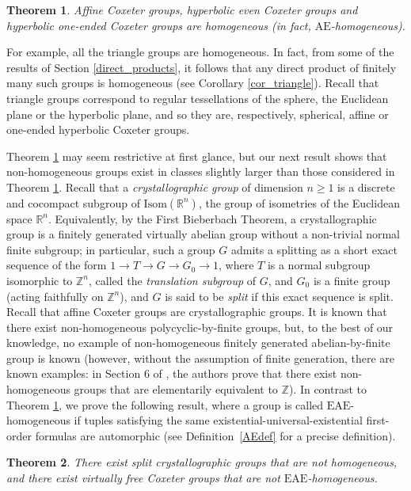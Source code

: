 \documentclass[a4paper, 11pt]{amsart}
\newtheorem{te}{Theorem}[section]
\theoremstyle{definition}
\theoremstyle{remark}
\renewcommand{\geq}{\geqslant}
\begin{document}
\begin{te}\label{theorem1}
Affine Coxeter groups, hyperbolic even Coxeter groups and hyperbolic one-ended Coxeter groups are homogeneous (in fact, $\mathrm{AE}$-homogeneous).
\end{te}

For example, all the triangle groups are homogeneous. In fact, from some of the results of Section \ref{direct_products}, it follows that any direct product of finitely many such groups is homogeneous (see Corollary \ref{cor_triangle}). Recall that triangle groups correspond to regular tessellations of the sphere, the Euclidean plane or the hyperbolic plane, and so they are, respectively, spherical, affine or one-ended hyperbolic Coxeter groups. 

\smallskip

Theorem \ref{theorem1} may seem restrictive at first glance, but our next result shows that non-homogeneous groups exist in classes slightly larger than those considered in Theorem \ref{theorem1}. Recall that a \emph{crystallographic group} of dimension $n\geq 1$ is a discrete and cocompact subgroup of $\mathrm{Isom}(\mathbb{R}^n)$, the group of isometries of the Euclidean space $\mathbb{R}^n$. Equivalently, by the First Bieberbach Theorem, a crystallographic group is a finitely generated virtually abelian group without a non-trivial normal finite subgroup; in particular, such a group $G$ admits a splitting as a short exact sequence of the form $1\rightarrow T\rightarrow G\rightarrow G_0\rightarrow 1$, where $T$ is a normal subgroup isomorphic to $\mathbb{Z}^n$, called the \emph{translation subgroup} of $G$, and $G_0$ is a finite group (acting faithfully on $\mathbb{Z}^n$), and $G$ is said to be \emph{split} if this exact sequence is split. Recall that affine Coxeter groups are crystallographic groups. It is known that there exist non-homogeneous polycyclic-by-finite groups, but, to the best of our knowledge, no example of non-homogeneous finitely generated abelian-by-finite group is known (however, without the assumption of finite generation, there are known examples: in Section 6 of \cite{NS90}, the authors prove that there exist non-homogeneous groups that are elementarily equivalent to $\mathbb{Z}$). In contrast to Theorem \ref{theorem1}, we prove the following result, where a group is called $\mathrm{EAE}$-homogeneous if tuples satisfying the same existential-universal-existential first-order formulas are automorphic (see Definition~\ref{AEdef} for a precise definition). 

\begin{te}\label{theorem2}
There exist split crystallographic groups that are not homogeneous, and there exist virtually free Coxeter groups that are not $\mathrm{EAE}$-homogeneous.
\end{te}
\end{document}
